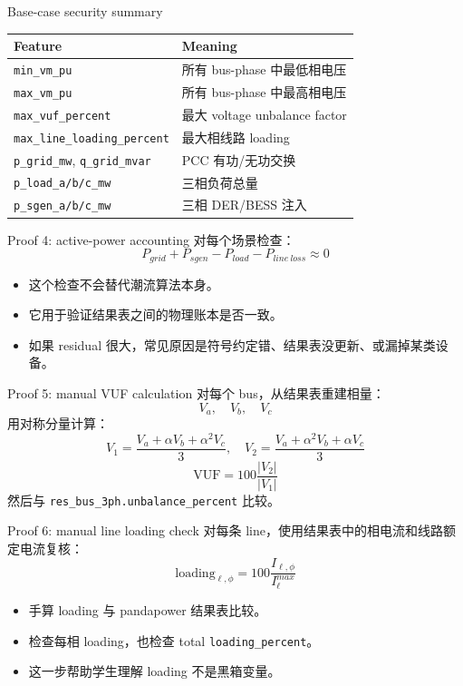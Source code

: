 \documentclass[aspectratio=169,11pt]{beamer}
\begin{document}
\begin{frame}{Base-case security summary}
\begin{table}
\centering
\scriptsize
\begin{tabular}{ll}
\toprule
Feature & Meaning \\
\midrule
\texttt{min\_vm\_pu} & 所有 bus-phase 中最低相电压 \\
\texttt{max\_vm\_pu} & 所有 bus-phase 中最高相电压 \\
\texttt{max\_vuf\_percent} & 最大 voltage unbalance factor \\
\texttt{max\_line\_loading\_percent} & 最大相线路 loading \\
\texttt{p\_grid\_mw}, \texttt{q\_grid\_mvar} & PCC 有功/无功交换 \\
\texttt{p\_load\_a/b/c\_mw} & 三相负荷总量 \\
\texttt{p\_sgen\_a/b/c\_mw} & 三相 DER/BESS 注入 \\
\bottomrule
\end{tabular}
\end{table}
\end{frame}

\begin{frame}{Proof 4: active-power accounting}
对每个场景检查：
\[
P_{grid}+P_{sgen}-P_{load}-P_{line\ loss}\approx 0
\]
\begin{itemize}
  \item 这个检查不会替代潮流算法本身。
  \item 它用于验证结果表之间的物理账本是否一致。
  \item 如果 residual 很大，常见原因是符号约定错、结果表没更新、或漏掉某类设备。
\end{itemize}
\end{frame}

\begin{frame}{Proof 5: manual VUF calculation}
对每个 bus，从结果表重建相量：
\[
V_a,\quad V_b,\quad V_c
\]
用对称分量计算：
\[
V_1 = \frac{V_a + \alpha V_b + \alpha^2 V_c}{3},\quad
V_2 = \frac{V_a + \alpha^2 V_b + \alpha V_c}{3}
\]
\[
\mathrm{VUF}=100\frac{|V_2|}{|V_1|}
\]
然后与 \texttt{res\_bus\_3ph.unbalance\_percent} 比较。
\end{frame}

\begin{frame}{Proof 6: manual line loading check}
对每条 line，使用结果表中的相电流和线路额定电流复核：
\[
\mathrm{loading}_{\ell,\phi} = 100\frac{I_{\ell,\phi}}{I^{max}_{\ell}}
\]
\begin{itemize}
  \item 手算 loading 与 pandapower 结果表比较。
  \item 检查每相 loading，也检查 total \texttt{loading\_percent}。
  \item 这一步帮助学生理解 loading 不是黑箱变量。
\end{itemize}
\end{frame}
\end{document}
